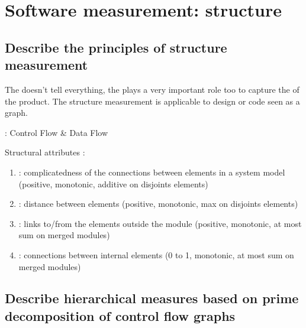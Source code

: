 \chapter{Software measurement: structure}

\section{Describe the principles of structure measurement}

The  doesn't tell everything, the  plays a very important role too to capture the  of the product. The structure measurement is applicable to design or code seen as a graph.

 :  Control Flow \& Data Flow

Structural attributes : 
\begin{enumerate}
    \item {} : complicatedness of the connections between elements in a system model (positive, monotonic, additive on disjoints elements)
    \item {} : distance between elements (positive, monotonic, max on disjoints elements)
    \item {} : links to/from the elements outside the module (positive, monotonic, at most sum on merged modules)
    \item {} : connections between internal elements (0 to 1, monotonic, at most sum on merged modules)
\end{enumerate}

\section{Describe hierarchical measures based on prime decomposition of control flow graphs}

